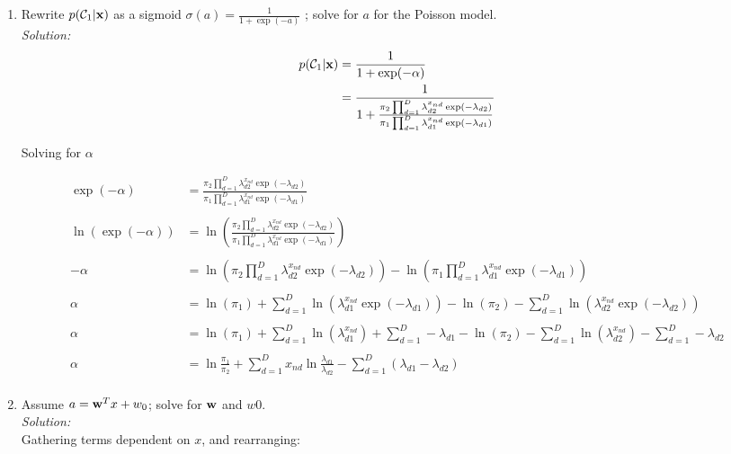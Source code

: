 \documentclass[12pt,a4paper]{article}
\newcommand{\lp}{\left(}
\newcommand{\rp}{\right)}
\newcommand{\xscalar}{x}
\newcommand{\xvec}{{\bf \xscalar}}
\newcommand{\wscalar}{w}
\newcommand{\wvec}{{\bf \wscalar}}
\newcommand{\class}{\mathcal{C}}
\newcommand{\sigmoid}{\sigma}
\begin{document}
\begin{enumerate}
		\item Rewrite $p(\class_{1} | \xvec)$ as a sigmoid $\sigmoid(a) = \frac{1}{1 + \exp(-a)}$ ; solve for $a$ for the Poisson model. \\
		\emph{Solution:} \\
		
		\begin{align*}
			p(\class_{1} | \xvec) &= \frac{1}{1 + \exp(-\alpha)}\\
			&= \frac{1} {1 + \frac{\pi_2 \prod_{d=1}^{D}\lambda_{d2}^{x_{nd}} \exp(-\lambda_{d2})}{\pi_1 \prod_{d = 1}^{D}\lambda_{d1}^{x_{nd}} \exp(-\lambda_{d1})}} \\
		\end{align*}
		
		Solving for $\alpha$
		
		\begin{align*}
			\exp(-\alpha) &= \frac{\pi_2 \prod_{d=1}^{D}\lambda_{d2}^{x_{nd}} \exp(-\lambda_{d2})}{\pi_1 \prod_{d = 1}^{D}\lambda_{d1}^{x_{nd}} \exp(-\lambda_{d1})}\\\\
			\ln \lp \exp(-\alpha) \rp &= \ln \lp \frac{\pi_2 \prod_{d=1}^{D}\lambda_{d2}^{x_{nd}} \exp(-\lambda_{d2})}{\pi_1 \prod_{d = 1}^{D}\lambda_{d1}^{x_{nd}} \exp(-\lambda_{d1})} \rp \\\\
			-\alpha &= \ln \lp \pi_2 \prod_{d=1}^{D}\lambda_{d2}^{x_{nd}} \exp(-\lambda_{d2}) \rp - \ln \lp \pi_1 \prod_{d = 1}^{D}\lambda_{d1}^{x_{nd}} \exp(-\lambda_{d1}) \rp \\\\
			\alpha &= \ln \lp \pi_1 \rp + \sum_{d = 1}^{D} \ln \lp \lambda_{d1}^{x_{nd}} \exp(-\lambda_{d1}) \rp - \ln \lp \pi_2 \rp - \sum_{d=1}^{D}\ln \lp \lambda_{d2}^{x_{nd}} \exp(-\lambda_{d2}) \rp  \\\\
			\alpha &= \ln \lp \pi_1 \rp + \sum_{d = 1}^{D} \ln \lp \lambda_{d1}^{x_{nd}} \rp + \sum_{d = 1}^{D} -\lambda_{d1} - \ln \lp \pi_2 \rp - \sum_{d=1}^{D} \ln \lp \lambda_{d2}^{x_{nd}} \rp - \sum_{d=1}^{D} -\lambda_{d2}  \\\\
			\alpha &= \ln \frac{\pi_1}{\pi_2} + \sum_{d=1}^{D} x_{nd} \ln\frac{\lambda_{d1}}{\lambda_{d2}} - \sum_{d=1}^{D}(\lambda_{d1} - \lambda_{d2}) \\
		\end{align*}
		
		\item Assume $a = \wvec^{T}x + w_{0}$; solve for $\wvec$ and $w0$. \\
		\emph{Solution:} \\
		Gathering terms dependent on $x$, and rearranging:
		

\end{enumerate}
\end{document}
